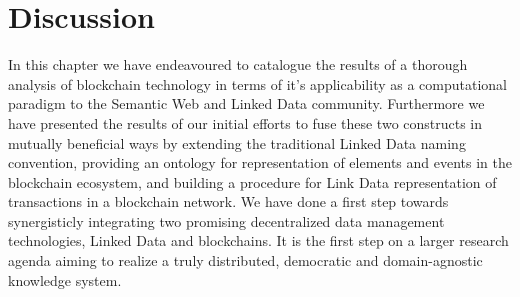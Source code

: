 \section{Discussion}

In this chapter we have endeavoured to catalogue the results of a thorough analysis of blockchain technology in terms of it's applicability as a computational paradigm to the Semantic Web and Linked Data community. Furthermore we have presented the results of our initial efforts to fuse these two constructs in mutually beneficial ways by extending the traditional Linked Data naming convention, providing an ontology for representation of elements and events in the blockchain ecosystem, and building a procedure for Link Data representation of transactions in a blockchain network. We have done a first step towards synergisticly integrating two promising decentralized data management technologies, Linked Data and blockchains.
It is the first step on a larger research agenda aiming to realize a truly distributed, democratic and domain-agnostic knowledge system.


